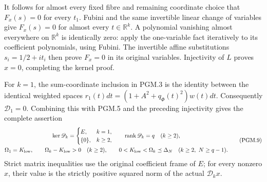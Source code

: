 It follows for almost every fixed fibre and remaining coordinate
choice that \(F_x(s)=0\) for every \(t_1\). Fubini and the same
invertible linear change of variables give \(F_x(s)=0\) for
almost every \(t\in\mathbb{R}^k\). A polynomial vanishing almost
everywhere on \(\mathbb{R}^k\) is identically zero: apply the
one-variable fact iteratively to its coefficient polynomials,
using Fubini. The invertible affine substitutions
\(s_i=1/2+it_i\) then prove \(F_x=0\) in its original variables.
Injectivity of \(L\) proves \(x=0\), completing the kernel proof.

For \(k=1\), the sum-coordinate inclusion in PGM.3 is the
identity between the identical weighted spaces
\(r_1(t)dt=(1+A^2+q_\Phi(t)^2)w(t)dt\).
Consequently \(\mathscr D_1=0\). Combining this with PGM.5
and the preceding injectivity gives the complete assertion
\[
\begin{gathered}
 \ker\mathscr D_k=
 \begin{cases}E,&k=1,\\ \{0\},&k\geq2,\end{cases}
 \qquad
 \operatorname{rank}\mathscr D_k=q\quad(k\geq2),\\
 \Omega_1=K_{\rm low},\qquad
 \Omega_k-K_{\rm low}>0\quad(k\geq2),\qquad
 0<K_{\rm low}<\Omega_k\preceq\Delta_N
          \quad(k\geq2,\ N\geq q-1).
\end{gathered}
\tag{PGM.9}\label{eq:pgm-strict}
\]
Strict matrix inequalities use the original coefficient frame of
\(E\); for every nonzero \(x\), their value is the strictly
positive squared norm of the actual \(\mathscr D_kx\).

